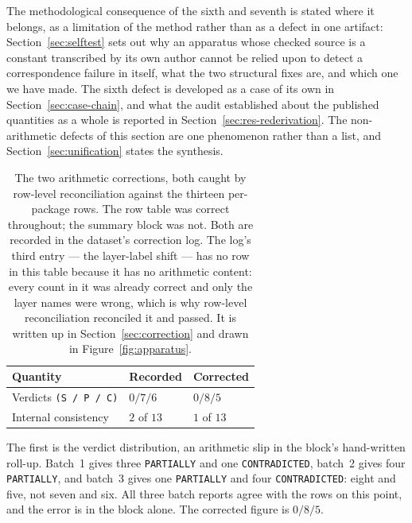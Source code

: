 \documentclass[sigconf,review]{acmart}
\begin{document}
The methodological consequence of the sixth and seventh is stated where it
belongs, as a limitation of the method rather than as a defect in one artifact:
Section~\ref{sec:selftest} sets out why an apparatus whose checked source is a
constant transcribed by its own author cannot be relied upon to detect a
correspondence failure in itself, what the two structural fixes are, and which
one we have made. The sixth defect is developed as a case of its own in
Section~\ref{sec:case-chain}, and what the audit established about the published
quantities as a whole is reported in Section~\ref{sec:res-rederivation}. The
non-arithmetic defects of this section are one phenomenon rather than a list,
and Section~\ref{sec:unification} states the synthesis.

\begin{table}[t]
\centering
\caption{The two arithmetic corrections, both caught by row-level reconciliation
against the thirteen per-package rows. The row table was correct throughout;
the summary block was not. Both are recorded in the dataset's correction log.
The log's third entry --- the layer-label shift --- has no row in this table
because it has no arithmetic content: every count in it was already correct
and only the layer names were wrong, which is why row-level reconciliation
reconciled it and passed. It is written up in
Section~\ref{sec:correction} and drawn in Figure~\ref{fig:apparatus}.}
\label{tab:recon}
\small
\setlength{\tabcolsep}{4pt}
\begin{tabular}{>{\raggedright\arraybackslash}p{}>{\raggedright\arraybackslash}p{}>{\raggedright\arraybackslash}p{}}
\toprule
Quantity & Recorded & Corrected \\
\midrule
Verdicts \texttt{(S / P / C)} & $0 / 7 / 6$ & $0 / 8 / 5$ \\
Internal consistency & $2$ of $13$ & $1$ of $13$ \\
\bottomrule
\end{tabular}
\end{table}

The first is the verdict distribution, an arithmetic slip in the block's
hand-written roll-up. Batch~1 gives three \texttt{PARTIALLY} and one
\texttt{CONTRADICTED}, batch~2 gives four \texttt{PARTIALLY}, and batch~3 gives
one \texttt{PARTIALLY} and four \texttt{CONTRADICTED}: eight and five, not
seven and six. All three batch reports agree with the rows on this point, and
the error is in the block alone. The corrected figure is $0 / 8 / 5$.
\end{document}
